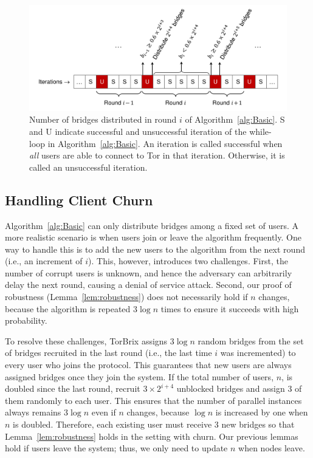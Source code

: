 \documentclass[letterpaper,twocolumn,10pt]{article}
\newcommand{\ie}{i.e.}
\newcommand{\sfsize}{\fontsize{0.73\baselineskip}{0.73\baselineskip}\selectfont}
\newcommand{\sans}[1]{\textsf{\sfsize \mbox{#1}}}
\newcommand{\brix}{\sans{TorBrix}\xspace}
\begin{document}
\begin{figure}
	\centering
	\includegraphics[width=0.7\linewidth]{images/rounds}
	\caption{Number of bridges distributed in round $i$ of Algorithm~\ref{alg:Basic}. S and U indicate successful and unsuccessful iteration of the while-loop in Algorithm~\ref{alg:Basic}. An iteration is called successful when \emph{all} users are able to connect to Tor in that iteration. Otherwise, it is called an unsuccessful iteration. }
	\label{fig:rounds}
\end{figure}

\subsection{Handling Client Churn} \label{sec:churn}
Algorithm~\ref{alg:Basic} can only distribute bridges among a fixed set of users. A more realistic scenario is when users join or leave the algorithm frequently. One way to handle this is to add the new users to the algorithm from the next round (\ie, an increment of $i$). This, however, introduces two challenges. First, the number of corrupt users is unknown, and hence the adversary can arbitrarily delay the next round, causing a denial of service attack. Second, our proof of robustness (Lemma~\ref{lem:robustness}) does not necessarily hold if $n$ changes, because the algorithm is repeated $3\log{n}$ times to ensure it succeeds with high probability.

To resolve these challenges, \brix assigns $3\log{n}$ random bridges from the set of bridges recruited in the last round (\ie, the last time $i$ was incremented) to every user who joins the protocol. This guarantees that new users are always assigned bridges once they join the system. If the total number of users, $n$, is doubled since the last round, recruit $3 \times 2^{i+4}$ unblocked bridges and assign $3$ of them randomly to each user.
This ensures that the number of parallel instances always remains $3\log{n}$ even if $n$ changes, because $\log{n}$ is increased by one when $n$ is doubled. Therefore, each existing user must receive $3$ new bridges so that Lemma~\ref{lem:robustness} holds in the setting with churn. Our previous lemmas hold if users leave the system; thus, we only need to update $n$ when nodes leave.
\end{document}
